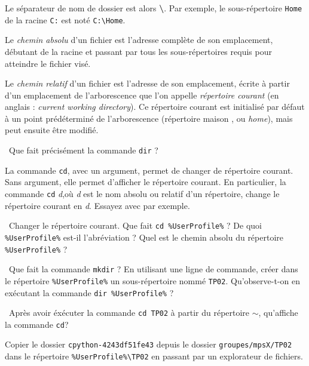 Le séparateur de nom de dossier est alors {\bf\textbackslash}. Par exemple, le sous-répertoire \texttt{Home} de la racine \texttt{C:} est noté \texttt{C:\textbackslash Home}. 

Le \emph{chemin absolu} d'un fichier est l'adresse complète de son emplacement,
débutant de la racine et passant par tous les sous-répertoires requis pour
atteindre le fichier visé.

Le \emph{chemin relatif} d'un fichier est l'adresse de son emplacement, écrite à partir d'un emplacement de l'arborescence que l'on appelle \emph{répertoire courant} (en anglais : \emph{current working directory}). 
Ce répertoire courant est initialisé par défaut à un point prédéterminé de l'arborescence (répertoire \og maison \fg, ou \emph{home}), mais peut ensuite être modifié.

\medskip

\question\ Que fait précisément la commande \texttt{dir} ?

\medskip

La commande \texttt{cd}, avec un argument, permet de changer de répertoire
courant. Sans argument, elle permet d'afficher le répertoire courant. En
particulier, la commande \texttt{cd} \textit{d},où \textit{d} est le nom absolu ou relatif
d'un répertoire, change le répertoire courant en
\textit{d}. Essayez avec par exemple.

\medskip

\question\ Changer le répertoire courant. Que fait \texttt{cd \%UserProfile\%} ?  De 
quoi \texttt{\%UserProfile\%} est-il l'abréviation ? Quel est le chemin absolu du répertoire \texttt{\%UserProfile\%} ?

\medskip

\question\ Que fait la commande \texttt{mkdir} ? En utilisant une ligne de commande, créer dans le répertoire \texttt{\%UserProfile\%} un sous-répertoire nommé \texttt{TP02}. Qu'observe-t-on en exécutant la commande \texttt{dir }\texttt{\%UserProfile\%} ? 

\medskip

\question\ Après avoir éxécuter la commande \texttt{cd TP02} à partir du répertoire $\sim$, qu'affiche la commande
  \texttt{cd}?
  
\medskip  

Copier le dossier \texttt{cpython-4243df51fe43} depuis le dossier \texttt{groupes/mpsX/TP02} dans le répertoire \texttt{\%UserProfile\%\textbackslash TP02} en passant par un explorateur de fichiers.  


